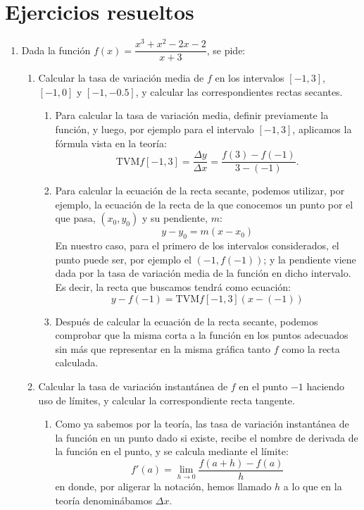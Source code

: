 \section{Ejercicios resueltos}
\begin{enumerate}[leftmargin=*]
\item Dada la función $f(x)=\dfrac{x^3+x^2-2x-2}{x+3}$, se pide:
\begin{enumerate}
\item Calcular la tasa de variación media de $f$ en los intervalos $[-1,3]$, $[-1,0]$ y $[-1,-0.5]$, y calcular las correspondientes rectas
secantes.
\begin{indicacion}
\begin{enumerate}
\item Para calcular la tasa de variación media, definir previamente la función, y luego, por ejemplo para el intervalo $[-1,3]$, aplicamos
la fórmula vista en la teoría:
\[
\textrm{TVM} f[-1,3]=\frac{\Delta y}{\Delta
x}=\frac{f(3)-f(-1)}{3-(-1)}.
\]
\item Para calcular la ecuación de la recta secante, podemos utilizar, por ejemplo, la ecuación de la recta de la que conocemos un punto por
el que pasa, $(x_0,y_0)$ y su pendiente, $m$:
\[
y - y_0  = m\left( {x - x_0 } \right)
\]
En nuestro caso, para el primero de los intervalos considerados, el punto puede ser, por ejemplo el $(-1,f(-1))$; y la pendiente viene dada
por la tasa de variación media de la función en dicho intervalo. Es decir, la recta que buscamos tendrá como ecuación:
\[
y - f( - 1) = \textrm {TVM} f[ - 1,3]\left( {x - ( - 1)} \right)
\]
\item Después de calcular la ecuación de la recta secante, podemos comprobar que la misma corta a la función en los puntos adecuados sin más
que representar en la misma gráfica tanto $f$ como la recta calculada.
\end{enumerate}
\end{indicacion}


\item Calcular la tasa de variación instantánea de $f$ en el punto $-1$ haciendo uso de límites, y calcular la correspondiente recta
tangente.
\begin{indicacion}
\begin{enumerate}
\item Como ya sabemos por la teoría, las tasa de variación instantánea de la función en un punto dado si existe, recibe el nombre de
derivada de la función en el punto, y se calcula mediante el límite:
\[
f'(a) = \mathop {\lim }\limits_{h \to 0} \frac{{f(a + h) - f(a)}}
{h}
\]
en donde, por aligerar la notación, hemos llamado $h$ a lo que en la teoría denominábamos $\Delta x$.


\end{enumerate}
\end{indicacion}
\end{enumerate}
\end{enumerate}

